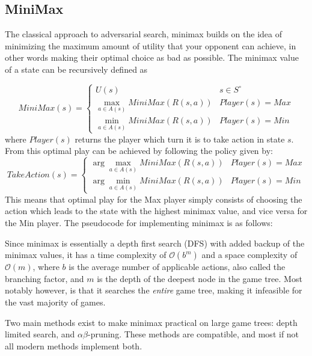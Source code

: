 \subsection{MiniMax}

The classical approach to adversarial search, minimax builds on the
idea of minimizing the maximum amount of utility that your opponent can
achieve, in other words making their optimal choice as bad as possible.
The minimax value of a state can be recursively defined as

\begin{equation}
    MiniMax(s) = \begin{cases}
        U(s) & s \in S^\circ \\
        \max_{a \in A(s)} MiniMax(R(s, a)) & Player(s) = Max \\
        \min_{a \in A(s)} MiniMax(R(s, a)) & Player(s) = Min
    \end{cases}
    \label{eq:minimax}
\end{equation}
where $Player(s)$ returns the player which turn it is to take action in
state $s$. From this optimal play can be achieved by following the policy
given by:
\begin{equation}
    TakeAction(s) = \begin{cases}
        \arg\max_{a \in A(s)} MiniMax(R(s, a)) & Player(s) = Max \\
        \arg\min_{a \in A(s)} MiniMax(R(s, a)) & Player(s) = Min
    \end{cases}
    \label{eq:minimax_policy}
\end{equation}
This means that optimal play for the Max player simply consists of choosing
the action which leads to the state with the highest minimax value, and
vice versa for the Min player. The pseudocode for implementing minimax
is as follows:



Since minimax is essentially a depth first
search (DFS) with added backup of the minimax values, it has a time complexity
of $\mathcal{O}(b^m)$ and a space complexity of $\mathcal{O}(m)$,
where $b$ is the average number of applicable actions, also called the 
branching factor, and $m$ is the depth of the deepest node in the game tree.
Most notably however, is that it searches the \textit{entire}
game tree, making it infeasible for the vast majority of games.

Two main methods exist to make minimax practical on large 
game trees: depth limited search, and $\alpha\beta$-pruning.
These methods are compatible, and most if not all modern methods
implement both. 

